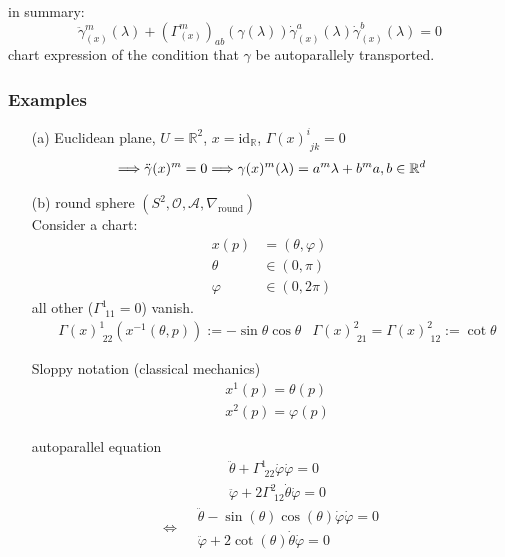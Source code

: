 \documentclass[10pt]{amsart}
\begin{document}
\begin{multicols*}{2}
	in summary:
\begin{equation}
\boxed{ 
	\ddot{\gamma}^m_{(x)}(\lambda) + (\Gamma^m_{(x)})_{ab}(\gamma(\lambda)) \dot{\gamma}^a_{(x)}(\lambda) \dot{\gamma}^b_{(x)}(\lambda) = 0  }
\end{equation}
chart expression of the condition that $\gamma$ be autoparallely transported.
	
	
	
\subsubsection*{Examples}
\begin{enumerate}
	\item[(a)] Euclidean plane, $U = \mathbb{R}^2$, $x= \text{id}_{\mathbb{R}}$, $\Gamma(x)^i_{\,\,jk} =0$
	\[
	\Longrightarrow \ddot{\gamma}(x)^m = 0 \Longrightarrow \gamma(x)^m(\lambda) = a^m \lambda + b^m \\
	a,b \in \mathbb{R}^d
	\]
	\item[(b)] round sphere $(S^2, \mathcal{O}, \mathcal{A}, \nabla_{\text{round}})$ \\
	Consider a chart: 
	\[
	\begin{aligned}
	x(p) & = (\theta, \varphi) \\
	\theta & \in (0, \pi) \\
	\varphi & \in (0, 2\pi)
	\end{aligned}	
	\]
	all other ($\Gamma^1_{\,\, 11} = 0$) vanish.
	\[
	\begin{aligned} 
		& \Gamma(x)^1_{\,\, 22} (x^{-1}(\theta, p)) := - \sin{\theta} \cos{\theta} 
		& \Gamma(x)^2_{\,\, 21} = \Gamma(x)^2_{\,\,12} := \cot{\theta}  
		\end{aligned} 
	\]

Sloppy notation (classical mechanics) \\
\[
\begin{aligned}
& x^1(p) = \theta(p) \\ 
& x^2(p) = \varphi(p)
\end{aligned}
\]
	
autoparallel equation
\[
\begin{aligned} 
& \ddot{\theta} + \Gamma^1_{\,\, 22} \dot{\varphi} \dot{\varphi} = 0 \\ 
& \ddot{\varphi} + 2 \Gamma^2_{\,\, 12} \dot{\theta}\dot{\varphi } = 0 
\end{aligned} 
\]
\[
\Longleftrightarrow \boxed{ 
	\begin{aligned}
	& \ddot{\theta} - \sin{(\theta)} \cos{(\theta)} \dot{\varphi} \dot{\varphi} = 0 \\ 
	& \ddot{\varphi} + 2\cot{(\theta)} \dot{\theta} \dot{\varphi} = 0 
	\end{aligned} }
\]
\end{enumerate}


\end{multicols*}
\end{document}
